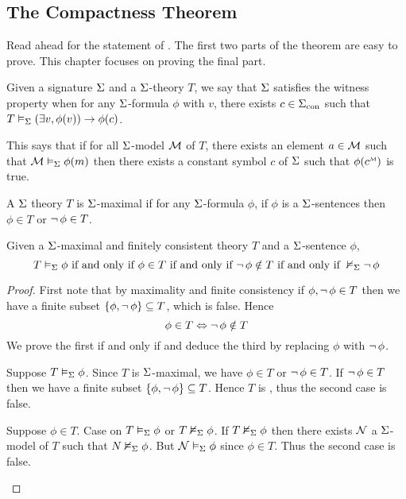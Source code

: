 \subsection{The Compactness Theorem}

Read ahead for the statement of .
The first two parts of the theorem are easy to prove.
This chapter focuses on proving the final part.

\begin{dfn}
    Given a signature $\Sigma$ and a $\Sigma$-theory $T$, 
    we say that $\Sigma$ satisfies the witness property when
    for any $\Sigma$-formula $\phi$ with 
     $v$,
    there exists $c \in {\Sigma}_\mathrm{con}$ such that 
    $T \vDash_{\Sigma} \left(\exists v, \phi(v)\right) \to \phi(c)$.
\end{dfn}
This says that if for all $\Sigma$-model $\mathcal{M}$ of $T$,
there exists an element $a \in \mathcal{M}$ such that $\mathcal{M} \vDash_{\Sigma} \phi(m)$
then there exists a constant symbol $c$ of $\Sigma$ 
such that $\phi(\mmintp{c})$ is true.

\begin{dfn}
    A $\Sigma$ theory $T$ is $\Sigma$-maximal if for any 
    $\Sigma$-formula $\phi$,
    if $\phi$ is a $\Sigma$-sentences then
    $\phi \in T$ or $\neg\, \phi \in T$.
\end{dfn}

\begin{prop}
    Given a $\Sigma$-maximal and finitely consistent theory $T$ and
    a $\Sigma$-sentence $\phi$, 
    \[ T \vDash_{\Sigma} \phi \text{ if and only if } \phi \in T
    \text{ if and only if } \neg\, \phi \notin T
    \text{ if and only if } \nvDash_{\Sigma} \neg\, \phi\]   
\end{prop}
\begin{proof}
    First note that by maximality and finite consistency
    if $\phi, \neg\, \phi \in T$ then we have a finite 
     subset 
    $\left\{\phi,\neg\, \phi\right\} \subseteq T$, which is false. 
    Hence
    \[\phi \in T \Leftrightarrow \neg\, \phi \notin T\]
    We prove the first if and only if and deduce the third by 
    replacing $\phi$ with $\neg\, \phi$.
        \begin{forward}
            Suppose $T \vDash_{\Sigma} \phi$.
            Since $T$ is $\Sigma$-maximal, 
            we have $\phi \in T$ or $\neg\, \phi \in T$.
            If $\neg\, \phi \in T$ then we have a finite subset 
            $\left\{\phi,\neg\, \phi\right\} \subseteq T$.
            Hence $T$ is ,  
            thus the second case is false.
        \end{forward}
        \begin{backward}
            Suppose $\phi \in T$. 
            Case on $T \vDash_{\Sigma} \phi$ or $T \nvDash_{\Sigma} \phi$.
            If $T \nvDash_{\Sigma} \phi$ then there exists 
            $\mathcal{N}$ a $\Sigma$-model of $T$ such that 
            $N \nvDash_{\Sigma} \phi$.
            But $\mathcal{N} \vDash_{\Sigma} \phi$ since $\phi \in T$.
            Thus the second case is false.
        \end{backward}
\end{proof}

